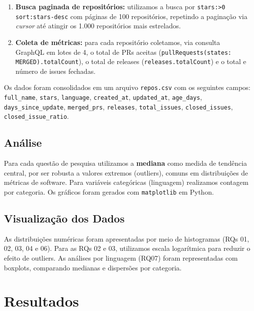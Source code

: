 \documentclass[10pt,a4paper,twocolumn]{article}
\begin{document}
\begin{enumerate}
  \item \textbf{Busca paginada de repositórios:} utilizamos a busca por
    \texttt{stars:>0 sort:stars-desc} com páginas de 100 repositórios,
    repetindo a paginação via \textit{cursor} até atingir os 1.000 repositórios
    mais estrelados.

  \item \textbf{Coleta de métricas:} para cada repositório coletamos, via
    consulta GraphQL em lotes de 4, o total de PRs aceitas
    (\texttt{pullRequests(states: MERGED)}\texttt{.totalCount}),
    o total de releases (\texttt{releases.totalCount}) e o total e
    número de issues fechadas.
\end{enumerate}

Os dados foram consolidados em um arquivo \texttt{repos.csv} com os seguintes
campos: \texttt{full\_name}, \texttt{stars}, \texttt{language},
\texttt{created\_at}, \texttt{updated\_at}, \texttt{age\_days},
\texttt{days\_since\_update}, \texttt{merged\_prs}, \texttt{releases},
\texttt{total\_issues}, \texttt{closed\_issues}, \texttt{closed\_issue\_ratio}.

\subsection{Análise}

Para cada questão de pesquisa utilizamos a \textbf{mediana} como medida de
tendência central, por ser robusta a valores extremos (outliers), comuns em
distribuições de métricas de software. Para variáveis categóricas (linguagem)
realizamos contagem por categoria. Os gráficos foram gerados com
\texttt{matplotlib} em Python.

\subsection{Visualização dos Dados}

As distribuições numéricas foram apresentadas por meio de histogramas
(RQs 01, 02, 03, 04 e 06). Para as RQs 02 e 03, utilizamos escala logarítmica
para reduzir o efeito de outliers. As análises por linguagem (RQ07) foram
representadas com boxplots, comparando medianas e dispersões por categoria.

\section{Resultados}
\end{document}
